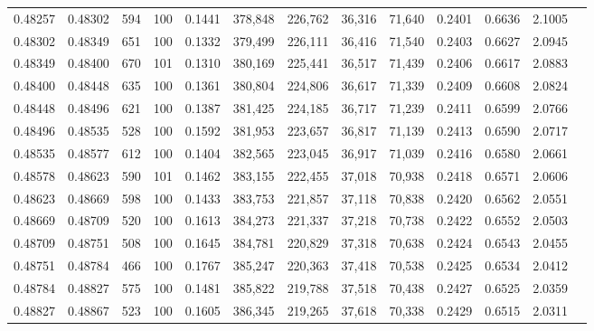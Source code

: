 \begin{tabular}{rrrrrrrrrrrrr}
0.48257 & 0.48302 &   594 & 100 &                                     0.1441 & 378,848 & 226,762 &  36,316 &  71,640 & 0.2401 & 0.6636 & 2.1005 \\
0.48302 & 0.48349 &   651 & 100 &                                     0.1332 & 379,499 & 226,111 &  36,416 &  71,540 & 0.2403 & 0.6627 & 2.0945 \\
0.48349 & 0.48400 &   670 & 101 &                                     0.1310 & 380,169 & 225,441 &  36,517 &  71,439 & 0.2406 & 0.6617 & 2.0883 \\
0.48400 & 0.48448 &   635 & 100 &                                     0.1361 & 380,804 & 224,806 &  36,617 &  71,339 & 0.2409 & 0.6608 & 2.0824 \\
0.48448 & 0.48496 &   621 & 100 &                                     0.1387 & 381,425 & 224,185 &  36,717 &  71,239 & 0.2411 & 0.6599 & 2.0766 \\
0.48496 & 0.48535 &   528 & 100 &                                     0.1592 & 381,953 & 223,657 &  36,817 &  71,139 & 0.2413 & 0.6590 & 2.0717 \\
0.48535 & 0.48577 &   612 & 100 &                                     0.1404 & 382,565 & 223,045 &  36,917 &  71,039 & 0.2416 & 0.6580 & 2.0661 \\
0.48578 & 0.48623 &   590 & 101 &                                     0.1462 & 383,155 & 222,455 &  37,018 &  70,938 & 0.2418 & 0.6571 & 2.0606 \\
0.48623 & 0.48669 &   598 & 100 &                                     0.1433 & 383,753 & 221,857 &  37,118 &  70,838 & 0.2420 & 0.6562 & 2.0551 \\
0.48669 & 0.48709 &   520 & 100 &                                     0.1613 & 384,273 & 221,337 &  37,218 &  70,738 & 0.2422 & 0.6552 & 2.0503 \\
0.48709 & 0.48751 &   508 & 100 &                                     0.1645 & 384,781 & 220,829 &  37,318 &  70,638 & 0.2424 & 0.6543 & 2.0455 \\
0.48751 & 0.48784 &   466 & 100 &                                     0.1767 & 385,247 & 220,363 &  37,418 &  70,538 & 0.2425 & 0.6534 & 2.0412 \\
0.48784 & 0.48827 &   575 & 100 &                                     0.1481 & 385,822 & 219,788 &  37,518 &  70,438 & 0.2427 & 0.6525 & 2.0359 \\
0.48827 & 0.48867 &   523 & 100 &                                     0.1605 & 386,345 & 219,265 &  37,618 &  70,338 & 0.2429 & 0.6515 & 2.0311 \\

\end{tabular}
